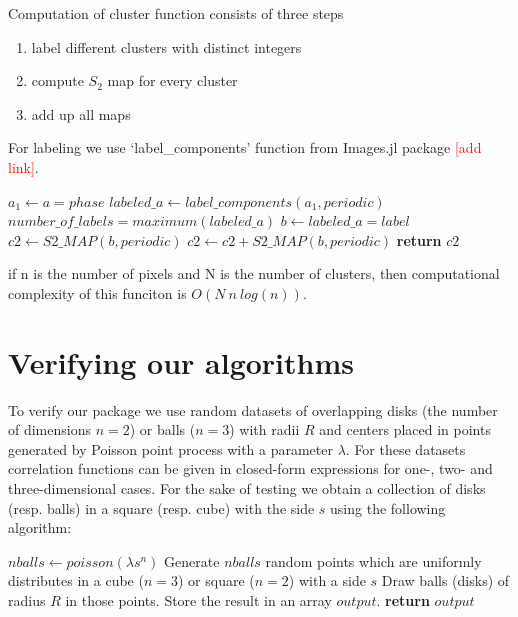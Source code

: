 \documentclass[reprint,amsmath,amssymb,aps,pre]{revtex4-1}
\begin{document}
Computation of cluster function consists of three steps
\begin{enumerate}
  \item label different clusters with distinct integers
  \item compute $S_2$ map for every cluster
  \item add up all maps
\end{enumerate}

For labeling we use `label\_components' function from
Images.jl package \textcolor{red}{[add link]}.

\begin{algorithmic}[1]
    \State $a_1 \gets a = phase$
    \State $labeled\_a \gets label\_components(a_1, periodic)$
    \State $number\_of\_labels = maximum(labeled\_a)$
      \State $b \gets labeled\_a = label$
        \State $c2 \gets S2\_MAP(b, periodic)$
      \Else
        \State $c2 \gets c2 + S2\_MAP(b, periodic)$
      \EndIf
    \EndFor
    \State \textbf{return} $c2$
  \EndProcedure
\end{algorithmic}

if n is the number of pixels and N is the number of clusters, then computational complexity
of this funciton is $O(N\ n\ log(n))$.

\section{Verifying our algorithms}
\label{verisec}
To verify our package we use random datasets of overlapping disks (the number of
dimensions $n = 2$) or balls ($n = 3$) with radii $R$ and centers placed in
points generated by Poisson point process with a parameter $\lambda$. For these
datasets correlation functions can be given in closed-form expressions for one-,
two- and three-dimensional cases. For the sake of testing we obtain a collection
of disks (resp. balls) in a square (resp. cube) with the side $s$ using the
following algorithm:
\begin{algorithmic}[1]
  \label{testdata}
    \State $nballs \gets poisson(\lambda s^n)$ 
    \State Generate $nballs$ random points which are uniformly distributes in
    a cube ($n = 3$) or square ($n = 2$) with a side $s$
    \State Draw balls (disks) of radius $R$ in those points. Store the result in
    an array $output$.
    \State \textbf{return} $output$
  \EndProcedure
\end{algorithmic}
\end{document}

